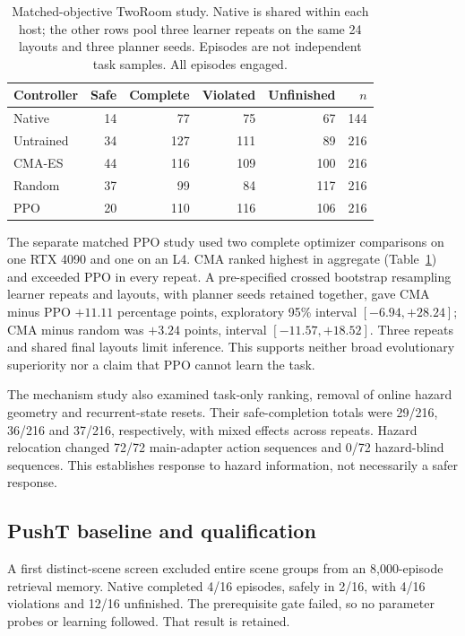 \documentclass[sigconf,nonacm]{acmart}
\begin{document}
\begin{table}[t]
\caption{Matched-objective TwoRoom study. Native is shared within each host; the
other rows pool three learner repeats on the same 24 layouts and three planner
seeds. Episodes are not independent task samples. All episodes engaged.}
\label{tab:ppo}
\centering\small
\begin{tabular}{lrrrrr}
\toprule
Controller & Safe & Complete & Violated & Unfinished & $n$\\
\midrule
Native & 14 & 77 & 75 & 67 & 144\\
Untrained & 34 & 127 & 111 & 89 & 216\\
CMA-ES & 44 & 116 & 109 & 100 & 216\\
Random & 37 & 99 & 84 & 117 & 216\\
PPO & 20 & 110 & 116 & 106 & 216\\
\bottomrule
\end{tabular}
\end{table}

The separate matched PPO study used two complete optimizer comparisons on one
RTX 4090 and one on an L4. CMA ranked highest in aggregate (Table~\ref{tab:ppo})
and exceeded PPO in every repeat. A pre-specified crossed bootstrap resampling
learner repeats and layouts, with planner seeds retained together, gave CMA minus
PPO $+11.11$ percentage points, exploratory 95\% interval $[-6.94,+28.24]$;
CMA minus random was $+3.24$ points, interval $[-11.57,+18.52]$.
Three repeats and shared final layouts limit inference. This supports neither
broad evolutionary superiority nor a claim that PPO cannot learn the task.

The mechanism study also examined task-only ranking, removal of online hazard
geometry and recurrent-state resets. Their safe-completion totals were 29/216,
36/216 and 37/216, respectively, with mixed effects across repeats. Hazard relocation
changed 72/72 main-adapter action sequences and 0/72 hazard-blind sequences. This
establishes response to hazard information, not necessarily a safer response.

\subsection{PushT baseline and qualification}
A first distinct-scene screen excluded entire scene groups from an 8,000-episode
retrieval memory. Native completed 4/16 episodes, safely in 2/16, with 4/16 violations
and 12/16 unfinished. The prerequisite gate failed, so no parameter probes or
learning followed. That result is retained.
\end{document}
